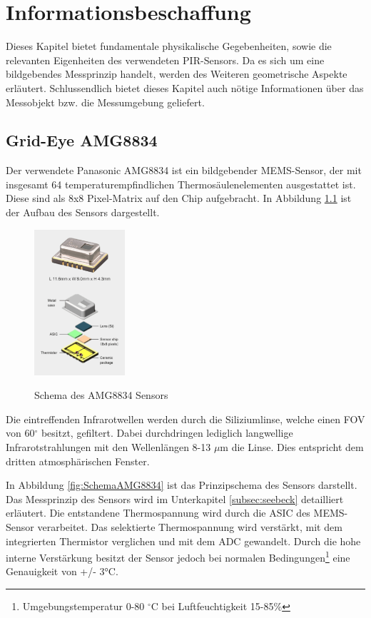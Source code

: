 \chapter{Informationsbeschaffung}
\label{chap:Informationsbeschaffung}
Dieses Kapitel bietet fundamentale physikalische Gegebenheiten, sowie die relevanten Eigenheiten des verwendeten \ac{PIR}-Sensors. Da es sich um eine bildgebendes Messprinzip handelt, werden des Weiteren geometrische Aspekte erläutert. Schlussendlich bietet dieses Kapitel auch nötige Informationen über das Messobjekt bzw. die Messumgebung geliefert.

\section{Grid-Eye AMG8834}
\label{sec:AMG8834}

Der verwendete Panasonic AMG8834 ist ein bildgebender \ac{MEMS}-Sensor, der mit insgesamt 64 temperaturempfindlichen Thermosäulenelementen ausgestattet ist. Diese sind als 8x8 Pixel-Matrix auf den Chip aufgebracht. In Abbildung \ref{fig:Explosionsdarstellung} ist der Aufbau des Sensors dargestellt.
 
\begin{figure}[H]
	\centering
	\includegraphics[width=0.3\textwidth]
	{fig/grid_eye_aufbau.PNG}
	\caption[Schema des AMG8834 Sensors]{Schema des AMG8834 Sensors} \protect\cite{AMG8834}
	\label{fig:Explosionsdarstellung}
\end{figure}
Die eintreffenden Infrarotwellen werden durch die Siliziumlinse, welche einen \ac{FOV} von 60$^\circ$ besitzt, gefiltert. Dabei durchdringen lediglich langwellige Infrarotstrahlungen mit den Wellenlängen 8-13 $\mu$m die Linse. Dies entspricht dem dritten atmosphärischen Fenster.

In Abbildung \ref{fig:SchemaAMG8834} ist das Prinzipschema des Sensors darstellt. Das Messprinzip des Sensors wird im Unterkapitel \ref{subsec:seebeck} detailliert erläutert. Die entstandene Thermospannung wird durch die \ac{ASIC} des \ac{MEMS}-Sensor verarbeitet. Das selektierte Thermospannung wird verstärkt, mit dem integrierten Thermistor verglichen und mit dem \ac{ADC} gewandelt. Durch die hohe interne Verstärkung besitzt der Sensor jedoch bei normalen Bedingungen\footnote[2]{Umgebungstemperatur 0-80 $^\circ$C bei Luftfeuchtigkeit 15-85\%} eine Genauigkeit von +/- 3°C. 

